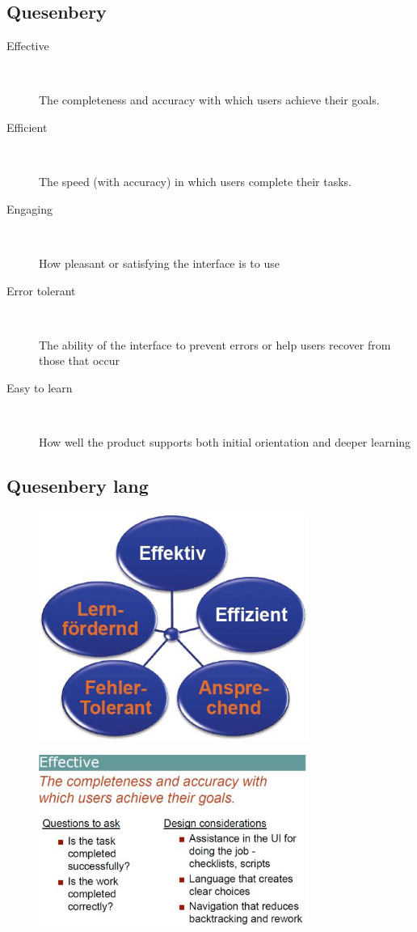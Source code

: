 \documentclass{report}
\begin{document}
\subsection*{Quesenbery}

\begin{description}
\item[Effective]~\par
The completeness and accuracy with
which users achieve their goals.
\item[Efficient]~\par
The speed (with accuracy) in which users
complete their tasks.
\item[Engaging]~\par
How pleasant or satisfying the interface is
to use
\item[Error tolerant]~\par
The ability of the interface to prevent errors
or help users recover from those that occur
\item[Easy to learn]~\par
How well the product supports both initial
orientation and deeper learning
\end{description}

\newpage
\subsection*{Quesenbery lang}
\begin{figure}[ht!]
\includegraphics[width=250pt]{overview.png}
\end{figure}

\begin{figure}[ht!]
\includegraphics[width=250pt]{effective.png}
\end{figure}
\end{document}
